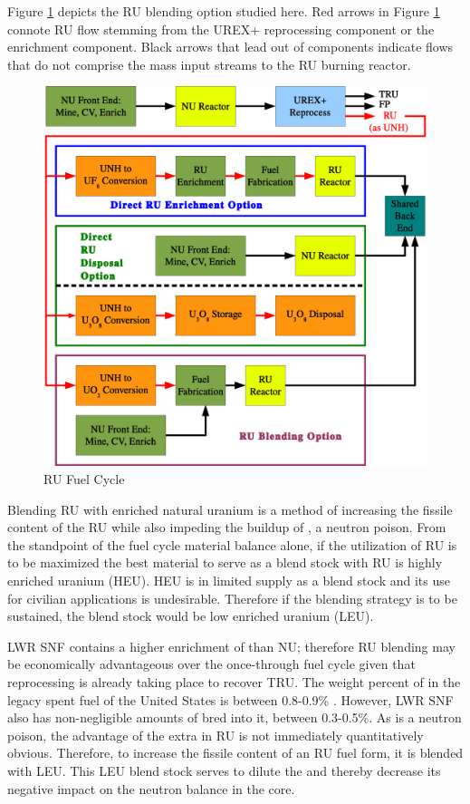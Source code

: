 Figure \ref{1g_fig08} depicts the RU blending option studied here.  Red arrows in Figure \ref{1g_fig08} 
connote RU flow stemming from the UREX+ reprocessing component or the enrichment component.  Black arrows 
that lead out of components indicate flows that do not comprise the mass input streams to the RU burning reactor.  
\begin{figure}[htbp]
\caption{RU Fuel Cycle}
\label{1g_fig08}
\begin{center}
\includegraphics[scale=0.5]{one_group_method/figs/Fig08.eps}
\end{center}
\end{figure}
Blending RU with enriched natural uranium is a method of increasing the fissile content of the RU while 
also impeding the buildup of , a neutron poison.  From the standpoint of the fuel cycle material 
balance alone, if the utilization of RU is to be maximized the best material to serve as a blend stock with 
RU is highly enriched uranium (HEU).  HEU is in limited supply as a blend stock and its use for civilian 
applications is undesirable.  Therefore if the blending strategy is to be sustained, the blend stock would be low 
enriched uranium (LEU).  

LWR SNF contains a higher enrichment of  than NU; therefore RU blending may be economically 
advantageous over the once-through fuel cycle given that reprocessing is already taking place to recover 
TRU. The weight percent of  in the legacy spent fuel of the United States is between 
0.8-0.9\% \cite{Schneider2007}.  
However, LWR SNF also has non-negligible amounts of  bred into it, between 0.3-0.5\%.  
As  is a neutron poison, the advantage of the extra  in RU is not immediately 
quantitatively obvious.  Therefore, to increase the fissile content of an RU fuel form, it is blended 
with LEU. This LEU blend stock serves to dilute the  and thereby decrease its negative 
impact on the neutron balance in the core. 

